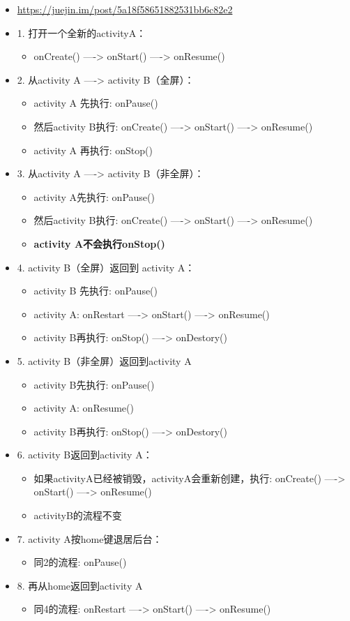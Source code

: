 \documentclass[9pt, b5paaper]{book}
\begin{document}
\begin{itemize}
\item \url{https://juejin.im/post/5a18f58651882531bb6c82e2}
\item 1. 打开一个全新的activityA：
\begin{itemize}
\item onCreate() ----> onStart() ----> onResume()
\end{itemize}
\item 2. 从activity A ----> activity B（全屏）：
\begin{itemize}
\item activity A 先执行: onPause()
\item 然后activity B执行: onCreate() ----> onStart() ----> onResume()
\item activity A 再执行: onStop()
\end{itemize}
\item 3. 从activity A ----> activity B（非全屏）：
\begin{itemize}
\item activity A先执行: onPause()
\item 然后activity B执行: onCreate() ----> onStart() ----> onResume()
\item \textbf{activity A不会执行onStop()}
\end{itemize}
\item 4. activity B（全屏）返回到 activity A：
\begin{itemize}
\item activity B 先执行: onPause()
\item activity A: onRestart ----> onStart() ----> onResume()
\item activity B再执行: onStop() ----> onDestory()
\end{itemize}
\item 5. activity B（非全屏）返回到activity A 
\begin{itemize}
\item activity B先执行: onPause()
\item activity A: onResume()
\item activity B再执行: onStop() ----> onDestory()
\end{itemize}
\item 6. activity B返回到activity A：
\begin{itemize}
\item 如果activityA已经被销毁，activityA会重新创建，执行: onCreate() ----> onStart() ----> onResume()
\item activityB的流程不变
\end{itemize}
\item 7. activity A按home键退居后台：
\begin{itemize}
\item 同2的流程: onPause()
\end{itemize}
\item 8. 再从home返回到activity A
\begin{itemize}
\item 同4的流程: onRestart ----> onStart() ----> onResume()
\end{itemize}
\end{itemize}
\end{document}
